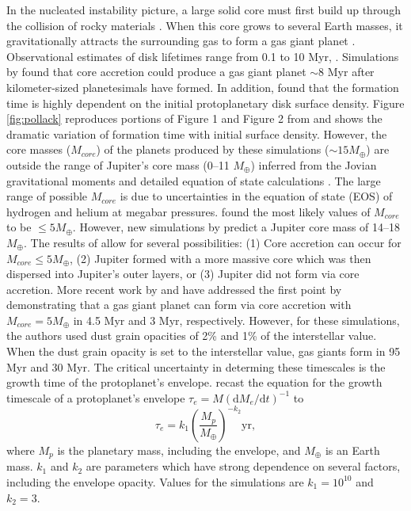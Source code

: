 In the nucleated instability picture, a large solid core must first build up through the collision of rocky materials \citep{safronov1969}. When this core grows to several Earth masses, it gravitationally attracts the surrounding gas to form a gas giant planet \citep{mizuno1980}. Observational estimates of disk lifetimes range from 0.1 to 10 Myr, \citep{haisch2001,chen2004}. Simulations by \citet{pollack1996} found that core accretion could produce a gas giant planet $\sim 8$ Myr after kilometer-sized planetesimals have formed. In addition, \citet{pollack1996} found that the formation time is highly dependent on the initial protoplanetary disk surface density. Figure \ref{fig:pollack} reproduces portions of Figure 1 and Figure 2 from \citep{pollack1996} and shows the dramatic variation of formation time with initial surface density. However, the core masses ($M_{core}$) of the planets produced by these simulations ($\sim 15 M_{\oplus}$) are outside the range of Jupiter's core mass (0--11 $M_{\oplus}$) inferred from the Jovian gravitational moments and detailed equation of state calculations \citep{saumon2004}. The large range of possible $M_{core}$ is due to uncertainties in the equation of state (EOS) of hydrogen and helium at megabar pressures. \citet{saumon2004} found the most likely values of $M_{core}$ to be $\leq 5 M_{\oplus}$. However, new simulations by \citet{militzer2008} predict a Jupiter core mass of 14--18 $M_{\oplus}$. The results of \citet{saumon2004} allow for several possibilities: (1) Core accretion can occur for $M_{core} \leq 5 M_{\oplus}$, (2) Jupiter formed with a more massive core which was then dispersed into Jupiter's outer layers, or (3) Jupiter did not form via core accretion. More recent work by \citet{hub2005}  and \citet{papa2005} have addressed the first point by demonstrating that a gas giant planet can form via core accretion with $M_{core}=5 M_{\oplus}$ in 4.5 Myr and 3 Myr, respectively. However, for these simulations, the authors used dust grain opacities of 2\% and 1\% of the interstellar value. When the dust grain opacity is set to the interstellar value, gas giants form in 95 Myr and 30 Myr. The critical uncertainty in determing these timescales is the growth time of the protoplanet's envelope. \citet{ida2008} recast the equation for the growth timescale of a protoplanet's envelope $\tau_{e} = M(\mathrm{d}M_{e}/\mathrm{d}t)^{-1}$ to 
\begin{equation}
\tau_{e} = k_1 \left(\frac{M_p}{M_\oplus}\right)^{-k_2} \mathrm{yr},
\end{equation}
where $M_p$ is the planetary mass, including the envelope, and $M_\oplus$ is an Earth mass. $k_1$ and $k_2$ are parameters which have strong dependence on several factors, including the envelope opacity. Values for the \citet{pollack1996} simulations are $k_1=10^{10}$ and $k_2=3$.

